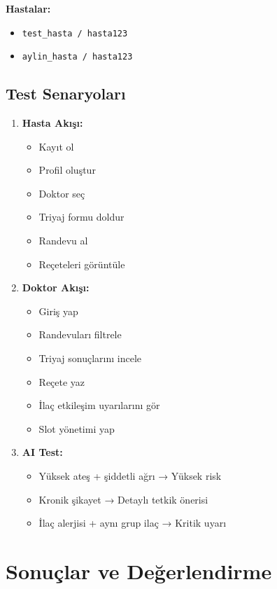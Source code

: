 \documentclass[12pt,a4paper]{article}
\begin{document}
\textbf{Hastalar:}
\begin{itemize}
    \item \texttt{test\_hasta / hasta123}
    \item \texttt{aylin\_hasta / hasta123}
\end{itemize}

\subsection{Test Senaryoları}
\begin{enumerate}
    \item \textbf{Hasta Akışı:}
    \begin{itemize}
        \item Kayıt ol
        \item Profil oluştur
        \item Doktor seç
        \item Triyaj formu doldur
        \item Randevu al
        \item Reçeteleri görüntüle
    \end{itemize}
    
    \item \textbf{Doktor Akışı:}
    \begin{itemize}
        \item Giriş yap
        \item Randevuları filtrele
        \item Triyaj sonuçlarını incele
        \item Reçete yaz
        \item İlaç etkileşim uyarılarını gör
        \item Slot yönetimi yap
    \end{itemize}
    
    \item \textbf{AI Test:}
    \begin{itemize}
        \item Yüksek ateş + şiddetli ağrı → Yüksek risk
        \item Kronik şikayet → Detaylı tetkik önerisi
        \item İlaç alerjisi + aynı grup ilaç → Kritik uyarı
    \end{itemize}
\end{enumerate}

\section{Sonuçlar ve Değerlendirme}
\end{document}
